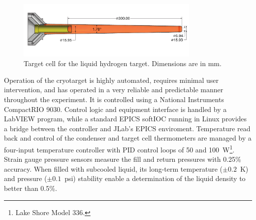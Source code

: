 \begin{figure}
\includegraphics[width=3.5in]{figures/GluexCell_mm.pdf}
\caption{Target cell for the liquid hydrogen target.  Dimensions are in mm.  }
\label{fig:TargetCell}
\end{figure}

Operation of the cryotarget is highly automated, requires minimal user intervention,
and has operated in a very reliable and predictable manner throughout the
experiment.  It is controlled using a
National Instruments CompactRIO 9030. 
Control logic and equipment interface is handled by a LabVIEW program, 
while a standard EPICS softIOC running in Linux provides a
bridge between the controller and JLab's EPICS enviroment.     
Temperature read back and control of the condenser and target cell thermometers
are managed by a four-input temperature
controller with PID control loops of 50 and 100~W\footnote{Lake Shore Model 336.}.
Strain gauge pressure sensors measure the fill and return pressures with 0.25\% 
accuracy.  When filled with subcooled liquid, 
its long-term temperature ($\pm 0.2$~K) and pressure ($\pm 0.1$~psi)
stability enable a determination of the liquid density to better than 0.5\%.


